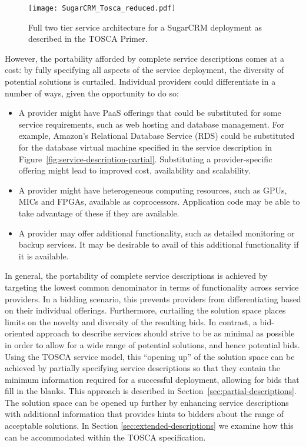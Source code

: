 \documentclass[10pt, conference, compsocconf]{IEEEtran}
\begin{document}
\begin{figure}[b]
\texttt{[image: SugarCRM\_Tosca\_reduced.pdf]}
\caption{Full two tier service architecture for a SugarCRM deployment as described in the TOSCA Primer.}
\label{fig:service-description-complete}
\end{figure}

However, the portability afforded by complete service descriptions comes at a cost: by fully specifying all aspects of the service deployment, the diversity of potential solutions is curtailed.  Individual providers could differentiate in a number of ways, given the opportunity to do so:

\begin{itemize}
\item A provider might have PaaS offerings that could be substituted for some service requirements, such as web hosting and database management. For example, Amazon's Relational Database Service (RDS) could be substituted for the database virtual machine specified in the service description in Figure~\ref{fig:service-description-partial}. Substituting a provider-specific offering might lead to improved cost, availability and scalability.
\item A provider might have heterogeneous computing resources, such as GPUs, MICs and FPGAs, available as coprocessors. Application code may be able to take advantage of these if they are available.
\item A provider may offer additional functionality, such as detailed monitoring or backup services. It may be desirable to avail of this additional functionality if it is available.
\end{itemize}

In general, the portability of complete service descriptions is achieved by targeting the lowest common denominator in terms of functionality across service providers. In a bidding scenario, this prevents providers from differentiating based on their individual offerings. Furthermore, curtailing the solution space places limits on the novelty and diversity of the resulting bids. In contrast, a bid-oriented approach to describe services should strive to be as minimal as possible in order to allow for a wide range of potential solutions, and hence potential bids. Using the TOSCA service model, this ``opening up'' of the solution space can be achieved by partially specifying service descriptions so that they contain the minimum information required for a successful deployment, allowing for bids that fill in the blanks. This approach is described in Section~\ref{sec:partial-descriptions}. The solution space can be opened up further by enhancing service descriptions with additional information that provides hints to bidders about the range of acceptable solutions. In Section \ref{sec:extended-descriptions} we examine how this can be accommodated within the TOSCA specification.
\end{document}
